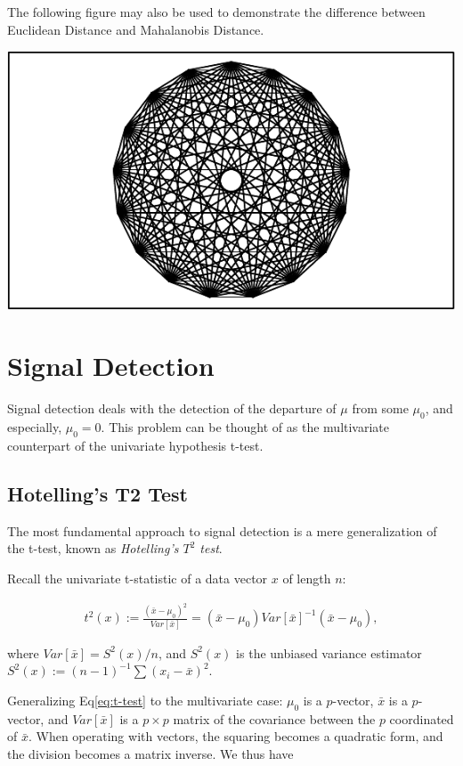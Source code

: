 \documentclass[]{book}
\theoremstyle{definition}
\theoremstyle{definition}
\theoremstyle{definition}
\theoremstyle{remark}
\let\BeginKnitrBlock\begin \let\EndKnitrBlock\end
\begin{document}
\BeginKnitrBlock{remark}
{}The following figure may also be used to
demonstrate the difference between Euclidean Distance and Mahalanobis
Distance.
\EndKnitrBlock{remark}

\includegraphics[width=0.5\linewidth]{Rcourse_files/figure-latex/unnamed-chunk-221-1}

\section{Signal Detection}\label{signal-detection}

Signal detection deals with the detection of the departure of \(\mu\)
from some \(\mu_0\), and especially, \(\mu_0=0\). This problem can be
thought of as the multivariate counterpart of the univariate hypothesis
t-test.

\subsection{Hotelling's T2 Test}\label{hotellings-t2-test}

The most fundamental approach to signal detection is a mere
generalization of the t-test, known as \emph{Hotelling's \(T^2\) test}.

Recall the univariate t-statistic of a data vector \(x\) of length
\(n\):

\begin{align}
  t^2(x):= \frac{(\bar{x}-\mu_0)^2}{Var[\bar{x}]}= (\bar{x}-\mu_0)Var[\bar{x}]^{-1}(\bar{x}-\mu_0),
  \label{eq:t-test}
\end{align}

where \(Var[\bar{x}]=S^2(x)/n\), and \(S^2(x)\) is the unbiased variance
estimator \(S^2(x):=(n-1)^{-1}\sum (x_i-\bar x)^2\).

Generalizing Eq\eqref{eq:t-test} to the multivariate case: \(\mu_0\) is a
\(p\)-vector, \(\bar x\) is a \(p\)-vector, and \(Var[\bar x]\) is a
\(p \times p\) matrix of the covariance between the \(p\) coordinated of
\(\bar x\). When operating with vectors, the squaring becomes a
quadratic form, and the division becomes a matrix inverse. We thus have
\end{document}
